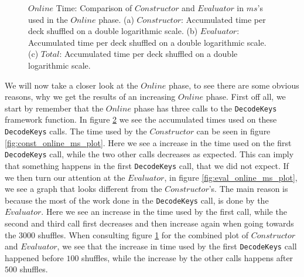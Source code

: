 \documentclass[twoside,11pt,openright]{report}
\begin{document}
\begin{figure}
    \begin{subfigure}{\textwidth}
        \centering
        \caption{}
        \label{fig:total_online_ms_plot}
    \end{subfigure}

    \caption{$Online$ Time: Comparison of $Constructor$ and $Evaluator$ in $ms$'s used in the $Online$ phase. (a) $Constructor$: Accumulated time per deck shuffled on a double logarithmic scale. (b) $Evaluator$: Accumulated time per deck shuffled on a double logarithmic scale. (c) $Total$: Accumulated time per deck shuffled on a double logarithmic scale.}
    \label{fig:mesurement_online_ms}
\end{figure}

We will now take a closer look at the $Online$ phase, to see there are some obvious reasons, why we get the results of an increasing $Online$ phase. First off all, we start by remember that the $Online$ phase has three calls to the \verb|DecodeKeys| framework function. In figure \ref{fig:mesurement_online_ms} we see the accumulated times used on these \verb|DecodeKeys| calls. The time used by the $Constructor$ can be seen in figure \ref{fig:const_online_ms_plot}. Here we see a increase in the time used on the first \verb|DecodeKeys| call, while the two other calls decreases as expected. This can imply that something happens in the first \verb|DecodeKeys| call, that we did not expect. If we then turn our attention at the $Evaluator$, in figure \ref{fig:eval_online_ms_plot}, we see a graph that looks different from the $Constructor$'s. The main reason is because the most of the work done in the \verb|DecodeKeys| call, is done by the $Evaluator$. Here we see an increase in the time used by the first call, while the second and third call first decreases and then increase again when going towards the $3000$ shuffles. When consulting figure \ref{fig:total_online_ms_plot} for the combined plot of $Constructor$ and $Evaluator$, we see that the increase in time used by the first \verb|DecodeKeys| call happened before $100$ shuffles, while the increase by the other calls happens after $500$ shuffles. 
\end{document}
